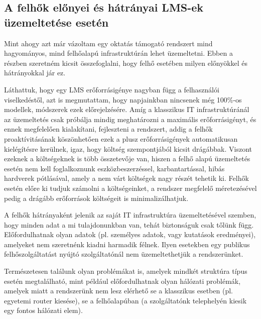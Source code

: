 \subsection{A felhők előnyei és hátrányai LMS-ek üzemeltetése esetén}

Mint ahogy azt már vázoltam egy oktatás támogató rendszert mind hagyományos, mind felhőalapú infrastruktúrán lehet üzemeltetni. Ebben a részben szeretném kicsit összefoglalni, hogy felhő esetében milyen előnyökkel és hátrányokkal jár ez.

Láthattuk, hogy egy LMS erőforrásigénye nagyban függ a felhasználói viselkedéstől, azt is megmutattam, hogy napjainkban nincsenek még 100\%-os modellek, módszerek ezek előrejelzésére. Amíg a klasszikus IT infrastruktúránál az üzemeltetés csak próbálja mindig meghatározni a maximális erőforrásigényt, és ennek megfelelően kialakítani, fejleszteni a rendszert, addig a felhők proaktívitásának köszönhetően ezek a plusz erőforrásigények automatikusan kielégítésre kerülnek, igaz, hogy költség szempontjából kicsit drágábbak. Viszont ezeknek a költségeknek is több összetevője van, hiszen a felhő alapú üzemeltetés esetén nem kell foglalkoznunk eszközbeszerzéssel, karbantartással, hibás hardverek pótlásával, amely a nem várt költségek nagy részét tehetik ki. Felhők esetén előre ki tudjuk számolni a költségeinket, a rendszer megfelelő méretezésével pedig a drágább  erőforrások költségeit is minimalizálhatjuk.

A felhők hátrányaként jelenik az saját IT infrastruktúra üzemeltetésével szemben, hogy minden adat a mi tulajdonunkban van, tehát biztonságuk csak tőlünk függ. Előfordulhatnak olyan adatok (pl. személyes adatok, vagy kutatások eredményei), amelyeket nem szeretnénk kiadni harmadik félnek. Ilyen esetekben egy publikus felhőszolgáltatást nyújtó szolgáltatónál nem üzemeltethetjük a rendszerünket.

Természetesen találunk olyan problémákat is, amelyek mindkét struktúra típus esetén megtalálható, mint például előfordulhatnak olyan hálózati problémák, amelyek miatt a rendszerünk nem lesz elérhető se a klasszikus esetben (pl. egyetemi router kiesése), se a felhőalapúban (a szolgáltatónk telephelyén kiesik egy fontos hálózati elem).
